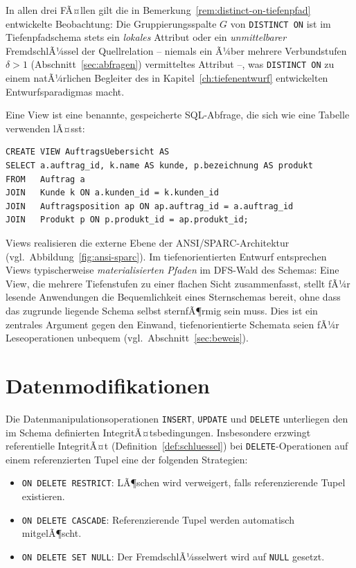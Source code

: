 ﻿\documentclass[a4paper,12pt]{report}
\theoremstyle{definition}
\theoremstyle{remark}
\begin{document}
In allen drei FÃ¤llen gilt die in
Bemerkung~\ref{rem:distinct-on-tiefenpfad} entwickelte
Beobachtung: Die Gruppierungsspalte $G$ von \texttt{DISTINCT ON} ist
im Tiefenpfadschema stets ein \emph{lokales} Attribut oder ein
\emph{unmittelbarer} FremdschlÃ¼ssel der Quellrelation -- niemals ein
Ã¼ber mehrere Verbundstufen $\delta>1$ (Abschnitt~\ref{sec:abfragen})
vermitteltes Attribut --, was \texttt{DISTINCT ON} zu einem
natÃ¼rlichen Begleiter des in Kapitel~\ref{ch:tiefenentwurf}
entwickelten Entwurfsparadigmas macht.



Eine View ist eine benannte, gespeicherte SQL-Abfrage, die sich wie eine
Tabelle verwenden lÃ¤sst:

\begin{lstlisting}
CREATE VIEW AuftragsUebersicht AS
SELECT a.auftrag_id, k.name AS kunde, p.bezeichnung AS produkt
FROM   Auftrag a
JOIN   Kunde k ON a.kunden_id = k.kunden_id
JOIN   Auftragsposition ap ON ap.auftrag_id = a.auftrag_id
JOIN   Produkt p ON p.produkt_id = ap.produkt_id;
\end{lstlisting}

Views realisieren die externe Ebene der ANSI/SPARC-Architektur (vgl.\
Abbildung~\ref{fig:ansi-sparc}). Im tiefenorientierten Entwurf
entsprechen Views typischerweise \emph{materialisierten Pfaden} im
DFS-Wald des Schemas: Eine View, die mehrere Tiefenstufen zu einer
flachen Sicht zusammenfasst, stellt fÃ¼r lesende Anwendungen die
Bequemlichkeit eines Sternschemas bereit, ohne dass das zugrunde
liegende Schema selbst sternfÃ¶rmig sein muss. Dies ist ein zentrales
Argument gegen den Einwand, tiefenorientierte Schemata seien fÃ¼r
Leseoperationen unbequem (vgl.\ Abschnitt~\ref{sec:beweis}).

\section{Datenmodifikationen}

Die Datenmanipulationsoperationen \texttt{INSERT}, \texttt{UPDATE} und
\texttt{DELETE} unterliegen den im Schema definierten
IntegritÃ¤tsbedingungen. Insbesondere erzwingt referentielle IntegritÃ¤t
(Definition~\ref{def:schluessel}) bei \texttt{DELETE}-Operationen auf
einem referenzierten Tupel eine der folgenden Strategien:

\begin{itemize}
  \item \texttt{ON DELETE RESTRICT}: LÃ¶schen wird verweigert, falls
    referenzierende Tupel existieren.
  \item \texttt{ON DELETE CASCADE}: Referenzierende Tupel werden
    automatisch mitgelÃ¶scht.
  \item \texttt{ON DELETE SET NULL}: Der FremdschlÃ¼sselwert wird auf
    \texttt{NULL} gesetzt.
\end{itemize}
\end{document}
